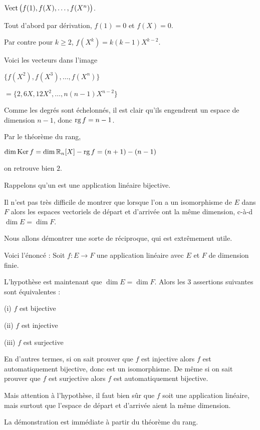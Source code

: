   $\mathop{\text{Vect}}\nolimits \big(f(1), f(X), \ldots, f(X^n) \big)$.
  
  \change
  Tout d'abord par dérivation, $f(1)=0$ et $f(X)=0$. 
  
  \change
  Par contre pour $k \ge 2$, $f(X^k) = k(k-1)X^{k-2}$.
  
  \change
  Voici les vecteurs dans l'image
  
  $\big\{f(X^2), f(X^3), \ldots, f(X^n) \big\} $
  
  $= \big\{2, 6X, 12X^2, \ldots, n(n-1)X^{n-2}\big\}$
  
  \change
  Comme les degrés sont échelonnés, il est clair qu'ils engendrent 
  un espace de dimension $n-1$, donc $\mathop{\text{rg}}\nolimits f = n-1$.
  
  \change
  Par le théorème du rang, 
  
  $\dim \mathop{\text{Ker}}\nolimits f = \dim \mathbb{R}_n[X] - \mathop{\text{rg}}\nolimits f = (n+1) - (n-1)$ 
  
  on retrouve bien $2$.


\diapo

Rappelons qu'un  est une application linéaire bijective.

Il n'est pas très difficile de montrer que lorsque l'on a un
isomorphisme de $E$ dans $F$ alors
les espaces vectoriels de départ et d'arrivée ont la même
dimension, c-à-d $\dim E =\dim F$.


\change
Nous allons démontrer une sorte de réciproque, qui est extrêmement utile.


Voici l'énoncé : 
Soit $f : E \to F$ une application linéaire avec $E$ et $F$ 
de dimension finie.

L'hypothèse est maintenant que $\dim E = \dim F$. Alors
les $3$ assertions suivantes sont équivalentes :

\change
(i) $f$ est bijective

(ii) $f$ est injective

(iii) $f$ est surjective

En d'autres termes, si on sait prouver que $f$ est injective alors $f$
est automatiquement bijective, donc est un isomorphisme.
De même si on sait prouver que $f$ est surjective alors $f$
est automatiquement bijective.

Mais attention à l'hypothèse, il faut bien sûr que $f$ soit une application linéaire,
mais surtout que l'espace de départ et d'arrivée aient la même dimension.


\change
La démonstration est immédiate à partir du théorème du rang. 

